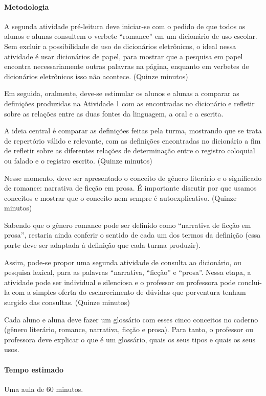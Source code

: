 \documentclass[12pt]{extarticle}
\begin{document}
{\paragraph{Metodologia}
A segunda atividade pré-leitura deve iniciar-se com o pedido de que
todos os alunos e alunas consultem o verbete ``romance'' em um
dicionário de uso escolar. Sem excluir a possibilidade de uso de
dicionários eletrônicos, o ideal nessa atividade é usar dicionários de
papel, para mostrar que a pesquisa em papel encontra necessariamente
outras palavras na página, enquanto em verbetes de dicionários
eletrônicos isso não acontece. (Quinze minutos)

Em seguida, oralmente, deve-se estimular os alunos e alunas a comparar
as definições produzidas na Atividade 1 com as encontradas no dicionário
e refletir sobre as relações entre as duas fontes da linguagem, a oral e
a escrita.

A ideia central é comparar as definições feitas pela turma, mostrando
que se trata de repertório válido e relevante, com as definições
encontradas no dicionário a fim de refletir sobre as diferentes relações
de determinação entre o registro coloquial ou falado e o registro
escrito. (Quinze minutos)

Nesse momento, deve ser apresentado o conceito de gênero literário e o
significado de romance: narrativa de ficção em prosa. É importante
discutir por que usamos conceitos e mostrar que o conceito nem sempre é
autoexplicativo. (Quinze minutos)

Sabendo que o gênero romance pode ser definido como ``narrativa de
ficção em prosa'', restaria ainda conferir o sentido de cada um dos
termos da definição (essa parte deve ser adaptada à definição que cada
turma produzir).

Assim, pode-se propor uma segunda atividade de consulta ao dicionário,
ou pesquisa lexical, para as palavras ``narrativa, ``ficção'' e
``prosa''. Nessa etapa, a atividade pode ser individual e silenciosa e o
professor ou professora pode conclui-la com a simples oferta do
esclarecimento de dúvidas que porventura tenham surgido das consultas.
(Quinze minutos)

Cada aluno e aluna deve fazer um glossário com esses cinco conceitos no
caderno (gênero literário, romance, narrativa, ficção e prosa). Para
tanto, o professor ou professora deve explicar o que é um glossário,
quais os seus tipos e quais os seus usos.

\paragraph{Tempo estimado} Uma aula de 60 minutos.

}
\end{document}
